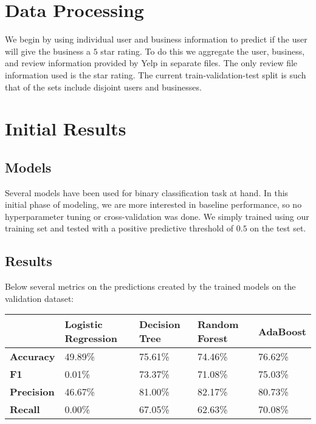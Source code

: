 \documentclass[letterpaper, 11pt]{article}
\begin{document}
\section{Data Processing}

We begin by using individual user and business information to predict if the user will give the business a $5$ star rating. To do this we aggregate the user, business, and review information provided by Yelp in separate files. The only review file information used is the star rating. The current train-validation-test split is such that of the sets include disjoint users and businesses.

\section{Initial Results}

\subsection{Models}

Several models have been used for binary classification task at hand. In this initial phase of modeling, we are more interested in baseline performance, so no hyperparameter tuning or cross-validation was done. We simply trained using our training set and tested with a positive predictive threshold of $0.5$ on the test set.

\subsection{Results}

Below several metrics on the predictions created by the trained models on the validation dataset:

\begin{center}
    \begin{tabular}{lllll}
    \hline
          & \textbf{Logistic Regression} & \textbf{Decision Tree} & \textbf{Random Forest} & \textbf{AdaBoost} \\
          \hline
\textbf{Accuracy}  & 49.89\%             & 75.61\%       & 74.46\%       & 76.62\%  \\
\textbf{F1}        & 0.01\%              & 73.37\%       & 71.08\%       & 75.03\%  \\
\textbf{Precision} & 46.67\%             & 81.00\%       & 82.17\%       & 80.73\%  \\
\textbf{Recall}    & 0.00\%              & 67.05\%       & 62.63\%       & 70.08\%
\end{tabular}
\end{center}
\end{document}
